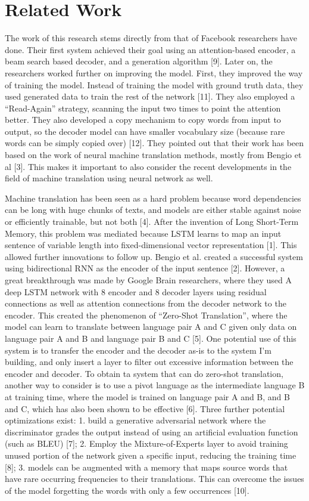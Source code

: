 \documentclass[letterpaper]{article} %
\begin{document}
\section{Related Work}
The work of this research stems directly from that of Facebook researchers have done. Their first system achieved their goal using an attention-based encoder, a beam search based decoder, and a generation algorithm [9]. Later on, the researchers worked further on improving the model. First, they improved the way of training the model. Instead of training the model with ground truth data, they used generated data to train the rest of the network [11]. They also employed a “Read-Again” strategy, scanning the input two times to point the attention better. They also developed a copy mechanism to copy words from input to output, so the decoder model can have smaller vocabulary size (because rare words can be simply copied over) [12]. They pointed out that their work has been based on the work of neural machine translation methods, mostly from Bengio et al [3]. This makes it important to also consider the recent developments in the field of machine translation using neural network as well.

Machine translation has been seen as a hard problem because word dependencies can be long with huge chunks of texts, and models are either stable against noise or efficiently trainable, but not both [4]. After the invention of Long Short-Term Memory, this problem was mediated because LSTM learns to map an input sentence of variable length into fixed-dimensional vector representation [1]. This allowed further innovations to follow up. Bengio et al. created a successful system using bidirectional RNN as the encoder of the input sentence [2]. However, a great breakthrough was made by Google Brain researchers, where they used A deep LSTM network with 8 encoder and 8 decoder layers using residual connections as well as attention connections from the decoder network to the encoder. This created the phenomenon of “Zero-Shot Translation”, where the model can learn to translate between language pair A and C given only data on language pair A and B and language pair B and C [5]. One potential use of this system is to transfer the encoder and the decoder as-is to the system I’m building, and only insert a layer to filter out excessive information between the encoder and decoder. To obtain ta system that can do zero-shot translation, another way to consider is to use a pivot language as the intermediate language B at training time, where the model is trained on language pair A and B, and B and C, which has also been shown to be effective [6]. Three further potential optimizations exist: 1. build a generative adversarial network where the discriminator grades the output instead of using an artificial evaluation function (such as BLEU) [7]; 2. Employ the Mixture-of-Experts layer to avoid training unused portion of the network given a specific input, reducing the training time [8]; 3. models can be augmented with a memory that maps source words that have rare occurring frequencies to their translations. This can overcome the issues of the model forgetting the words with only a few occurrences [10].
\end{document}
